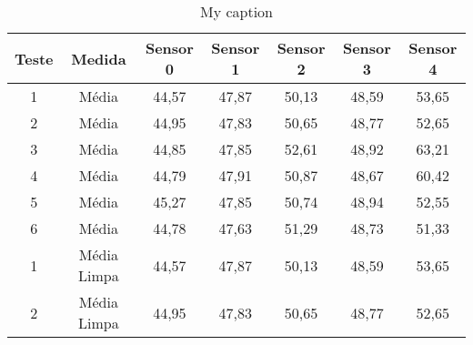 \begin{table}[]
\centering
\caption{My caption}
\label{my-label}
\begin{tabular}{|c|c|ccccc|}
\hline
\textbf{Teste}            & \textbf{Medida}                                                            & \textbf{Sensor 0}         & \textbf{Sensor 1}         & \textbf{Sensor 2}         & \textbf{Sensor 3}         & \textbf{Sensor 4}          \\ \hline
1                         & Média                                                                      & 44,57                     & 47,87                     & 50,13                     & 48,59                     & 53,65                      \\
2                         & Média                                                                      & 44,95                     & 47,83                     & 50,65                     & 48,77                     & 52,65                      \\
3                         & Média                                                                      & 44,85                     & 47,85                     & 52,61                     & 48,92                     & 63,21                      \\
4                         & Média                                                                      & 44,79                     & 47,91                     & 50,87                     & 48,67                     & 60,42                      \\
5                         & Média                                                                      & 45,27                     & 47,85                     & 50,74                     & 48,94                     & 52,55                      \\
6                         & Média                                                                      & 44,78                     & 47,63                     & 51,29                     & 48,73                     & 51,33                      \\ \hline
1                         & Média Limpa                                                                & 44,57                     & 47,87                     & 50,13                     & 48,59                     & 53,65                      \\
2                         & Média Limpa                                                                & 44,95                     & 47,83                     & 50,65                     & 48,77                     & 52,65                      \\

\end{tabular}
\end{table}
